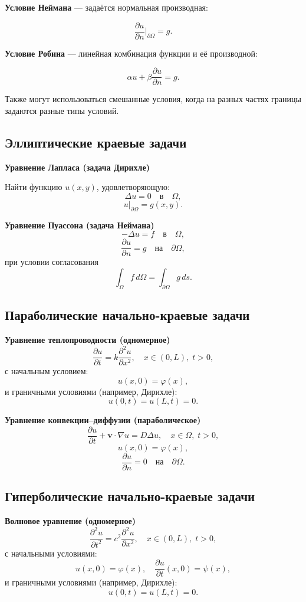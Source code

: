 \textbf{Условие Неймана} — задаётся нормальная производная:

$$\frac{\partial u}{\partial n}|_{\partial\Omega} = g.$$

\textbf{Условие Робина} — линейная комбинация функции и её производной:

$$\alpha u + \beta \frac{\partial u}{\partial n} = g.$$

Также могут использоваться смешанные условия, когда на разных частях границы задаются разные типы условий.

\subsection{Эллиптические краевые задачи}

\textbf{Уравнение Лапласа (задача Дирихле)}

Найти функцию \( u(x,y) \), удовлетворяющую:
\[
\Delta u = 0 \quad \text{в} \quad \Omega,
\]
\[
u|_{\partial\Omega} = g(x,y).
\]

\textbf{Уравнение Пуассона (задача Неймана)}
\[
-\Delta u = f \quad \text{в} \quad \Omega,
\]
\[
\frac{\partial u}{\partial n} = g \quad \text{на} \quad \partial\Omega,
\]
при условии согласования
\[
\int_\Omega f \, d\Omega = \int_{\partial\Omega} g \, ds.
\]

\subsection{Параболические начально-краевые задачи}

\textbf{Уравнение теплопроводности (одномерное)}
\[
\frac{\partial u}{\partial t} = k \frac{\partial^2 u}{\partial x^2}, \quad x \in (0, L), \; t > 0,
\]
с начальным условием:
\[
u(x, 0) = \varphi(x),
\]
и граничными условиями (например, Дирихле):
\[
u(0, t) = u(L, t) = 0.
\]

\textbf{Уравнение конвекции–диффузии (параболическое)}
\[
\frac{\partial u}{\partial t} + \mathbf{v} \cdot \nabla u = D \Delta u, \quad x \in \Omega, \; t > 0,
\]
\[
u(x, 0) = \varphi(x),
\]
\[
\frac{\partial u}{\partial n} = 0 \quad \text{на} \quad \partial\Omega.
\]

\subsection{Гиперболические начально-краевые задачи}

\textbf{Волновое уравнение (одномерное)}
\[
\frac{\partial^2 u}{\partial t^2} = c^2 \frac{\partial^2 u}{\partial x^2}, \quad x \in (0, L), \; t > 0,
\]
с начальными условиями:
\[
u(x, 0) = \varphi(x), \quad \frac{\partial u}{\partial t}(x, 0) = \psi(x),
\]
и граничными условиями (например, Дирихле):
\[
u(0, t) = u(L, t) = 0.
\]

